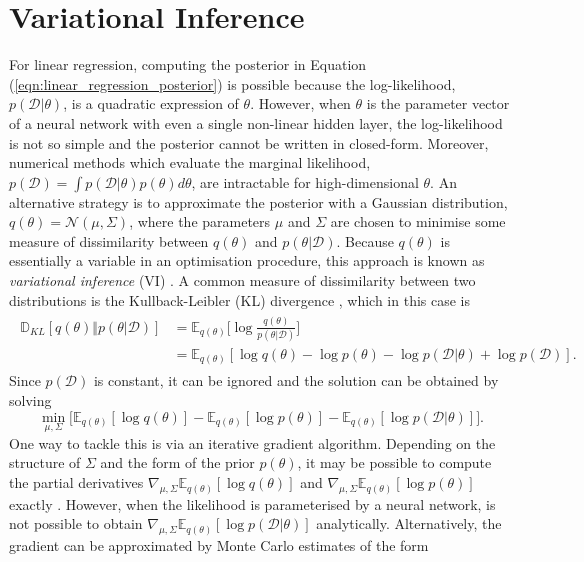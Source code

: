 \documentclass[msc,deptreport.inf]{infthesis} %
\newcommand{\E}{\mathbb E}
\newcommand{\D}{\mathbb D}
\begin{document}
\section{Variational Inference}\label{sec:vi}

For linear regression, computing the posterior in Equation (\ref{eqn:linear_regression_posterior}) is possible because the log-likelihood, $p(\mathcal{D} | \theta)$, is a quadratic expression of $\theta$. However, when $\theta$ is the parameter vector of a neural network with even a single non-linear hidden layer, the log-likelihood is not so simple and the posterior cannot be written in closed-form. Moreover, numerical methods which evaluate the marginal likelihood, $p(\mathcal{D}) = \int p(\mathcal{D} | \theta) p(\theta) d\theta$, are intractable for high-dimensional $\theta$. An alternative strategy is to approximate the posterior with a Gaussian distribution, $q(\theta) = \mathcal{N}(\mu, \Sigma)$, where the parameters $\mu$ and $\Sigma$ are chosen to minimise some measure of dissimilarity between $q(\theta)$ and $p(\theta | \mathcal{D})$. Because $q(\theta)$ is essentially a variable in an optimisation procedure, this approach is known as \emph{variational inference} (VI) \cite{barber2007}. A common measure of dissimilarity between two distributions is the Kullback-Leibler (KL) divergence \cite{barber2007}, which in this case is
\begin{align}
\begin{split}
	\D_{KL}[q(\theta) \Vert p(\theta | \mathcal{D})] 
	& = \E_{q(\theta)} \Big[\log \frac{q(\theta)}{p(\theta | \mathcal{D})}\Big] \\
	& = \E_{q(\theta)} [\log q(\theta) - \log p(\theta) - \log p(\mathcal{D} | \theta) + \log p(\mathcal{D})].
\end{split}
\end{align}
Since $p(\mathcal{D})$ is constant, it can be ignored and the solution can be obtained by solving 
\begin{equation}\label{eqn:vi_objective}
	\min_{\mu, \Sigma} \big[ \E_{q(\theta)} [\log q(\theta)] - \E_{q(\theta)} [\log p(\theta) ] - \E_{q(\theta)} [\log p(\mathcal{D} | \theta)] \big].
\end{equation}
One way to tackle this is via an iterative gradient algorithm. Depending on the structure of $\Sigma$ and the form of the prior $p(\theta)$, it may be possible to compute the partial derivatives $\nabla_{\mu, \Sigma} \E_{q(\theta)} [\log q(\theta)]$ and $\nabla_{\mu, \Sigma} \E_{q(\theta)} [\log p(\theta) ]$ exactly \cite{kingma2013}. However, when the likelihood is parameterised by a neural network, is not possible to obtain $ \nabla_{\mu, \Sigma}\E_{q(\theta)} [\log p(\mathcal{D} | \theta)]$ analytically. Alternatively, the gradient can be approximated by Monte Carlo estimates of the form 
\end{document}
